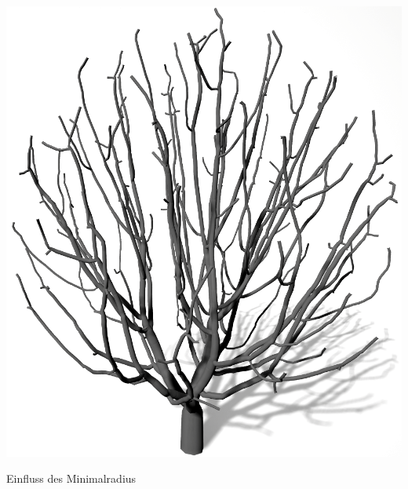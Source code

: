 \begin{center}
\begin{minipage}[c]{0.45\textwidth}
		\includegraphics[height=.9\textheight]{images/SCA_KDRI_LowKD_LowRI}
	\end{minipage}
	\vspace{0.05\textheight}
	
	Einfluss des Minimalradius
\end{center}





